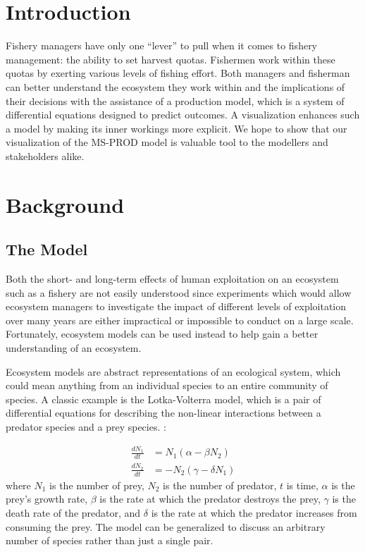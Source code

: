 \documentclass{article}
\begin{document}
\section{Introduction}

Fishery managers have only one ``lever'' to pull when it comes to fishery management: the ability to set harvest quotas.  Fishermen work within these quotas by exerting various levels of fishing effort.  Both managers and fisherman can better understand the ecosystem they work within and the implications of their decisions with the assistance of a production model, which is a system of differential equations designed to predict outcomes.  A visualization enhances such a model by making its inner workings more explicit. We hope to show that our visualization of the MS-PROD model is valuable tool to the modellers and stakeholders alike. 

\section{Background}

\subsection{The Model}

Both the short- and long-term effects of human exploitation on an ecosystem such as a fishery are not easily understood since experiments which would allow ecosystem managers to investigate the impact of different levels of exploitation over many years are either impractical or impossible to conduct on a large scale.  Fortunately, ecosystem models can be used instead to help gain a better understanding of an ecosystem.

Ecosystem models are abstract representations of an ecological system, which could mean anything from an individual species to an entire community of species.  A classic example is the Lotka-Volterra model, which is a pair of differential equations for describing the non-linear interactions between a predator species and a prey species. \cite{Lotka1926fds, VOL26a}:

\begin{align}
   \frac{d N_1}{dt} &=   N_1 \left(\alpha - \beta  N_2\right) 
\\ \frac{d N_2}{dt} &= - N_2 \left(\gamma - \delta N_1\right)
\end{align}
where $N_1$ is the number of prey, $N_2$ is the number of predator, $t$ is time, $\alpha$ is the prey's growth rate, $\beta$ is the rate at which the predator destroys the prey, $\gamma$ is the death rate of the predator, and $\delta$ is the rate at which the predator increases from consuming the prey.  The model can be generalized to discuss an arbitrary number of species rather than just a single pair.
\end{document}
